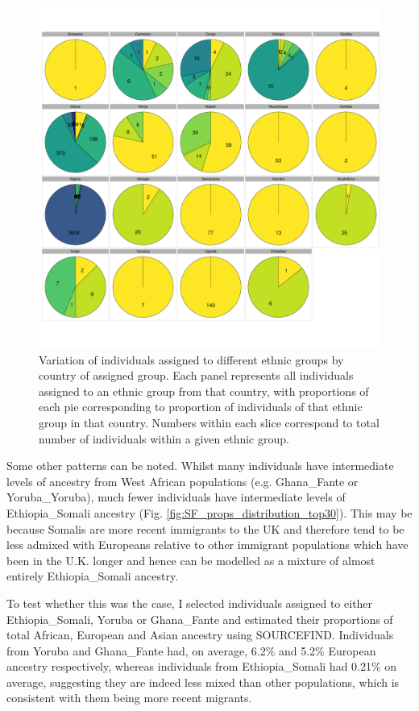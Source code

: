 \begin{figure}[htp]
    \centering
    \includegraphics[width=1.0\textwidth]{../images/chapter3/all_countries_SF_props_pie_chart.pdf}
    \caption{Variation of individuals assigned to different ethnic groups by country of assigned group. Each panel represents all individuals assigned to an ethnic group from that country, with proportions of each pie corresponding to proportion of individuals of that ethnic group in that country. Numbers within each slice correspond to total number of individuals within a given ethnic group.}
    \label{fig:all_countries_SF_props_pie_chart}
\end{figure}

Some other patterns can be noted. Whilst many individuals have intermediate levels of ancestry from West African populations (e.g. Ghana\_Fante or Yoruba\_Yoruba), much fewer individuals have intermediate levels of Ethiopia\_Somali ancestry (Fig. \ref{fig:SF_props_distribution_top30}). This may be because Somalis are more recent immigrants to the UK and therefore tend to be less admixed with Europeans relative to other immigrant populations which have been in the U.K. longer and hence can be modelled as a mixture of almost entirely Ethiopia\_Somali ancestry. 

To test whether this was the case, I selected individuals assigned to either Ethiopia\_Somali, Yoruba or Ghana\_Fante and estimated their proportions of total African, European and Asian ancestry using SOURCEFIND. Individuals from Yoruba and Ghana\_Fante had, on average, 6.2\% and 5.2\% European ancestry respectively, whereas individuals from Ethiopia\_Somali had 0.21\% on average, suggesting they are indeed less mixed than other populations, which is consistent with them being more recent migrants. 

